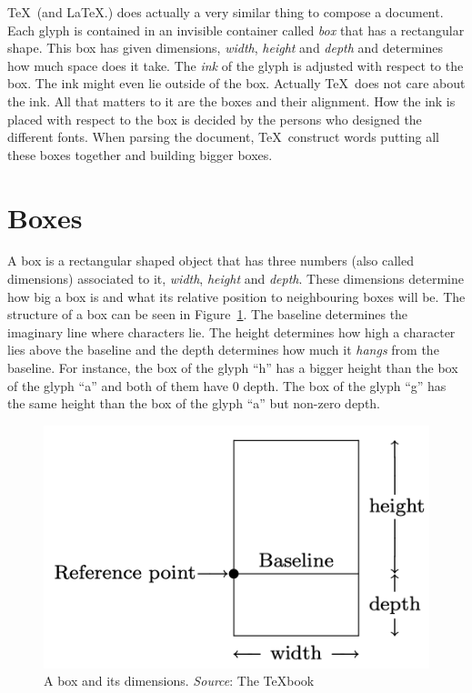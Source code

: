 \documentclass[a4paper]{article}
\begin{document}
\TeX\ (and \LaTeX{}.) does actually a very similar thing to compose a document. Each glyph is contained in an invisible container called \emph{box} that has a rectangular shape. This box has given dimensions, \emph{width}, \emph{height} and \emph{depth} and determines how much space does it take. The \emph{ink} of the glyph is adjusted with respect to the box. The ink might even lie outside of the box. Actually \TeX\ does not care about the ink. All that matters to it are the boxes and their alignment. How the ink is placed with respect to the box is decided by the persons who designed the different fonts. When parsing the document, \TeX\ construct words putting all these boxes together and building bigger boxes. 

\section{Boxes}

A box is a rectangular shaped object that has three numbers (also called dimensions) associated to it, \emph{width}, \emph{height} and \emph{depth}. These dimensions determine how big a box is and what its relative position to neighbouring boxes will be.  The structure of a box can be seen in Figure~\ref{fig:box}. The baseline determines the imaginary line where characters lie. The height determines how high a character lies above the baseline and the depth determines how much it \emph{hangs} from the baseline. For instance, the box of the glyph ``h'' has a bigger height than the box of the glyph ``a'' and both of them have 0 depth. The box of the glyph ``g'' has the same height than the box of the glyph ``a'' but non-zero depth.
%
\begin{figure}[h]
  \hfil\includegraphics[width=.7\textwidth]{glympse_figures/box.png}\hfil
  \caption{A box and its dimensions. \emph{Source}: The \TeX{}book \cite{Knuth1990}\label{fig:box}}
\end{figure}
\end{document}
